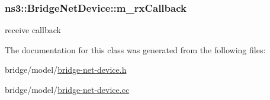 \subsubsection[{\texorpdfstring{m\+\_\+rx\+Callback}{m_rxCallback}}]{ ns3\+::\+Bridge\+Net\+Device\+::m\+\_\+rx\+Callback\hspace{0.3cm}{\ttfamily [private]}}\hypertarget{classns3_1_1BridgeNetDevice_a50ecd306e326a77a22666272606fe85a}{}\label{classns3_1_1BridgeNetDevice_a50ecd306e326a77a22666272606fe85a}


receive callback 



The documentation for this class was generated from the following files\+:\begin{DoxyCompactItemize}
\item 
bridge/model/\hyperlink{bridge-net-device_8h}{bridge-\/net-\/device.\+h}\item 
bridge/model/\hyperlink{bridge-net-device_8cc}{bridge-\/net-\/device.\+cc}\end{DoxyCompactItemize}
